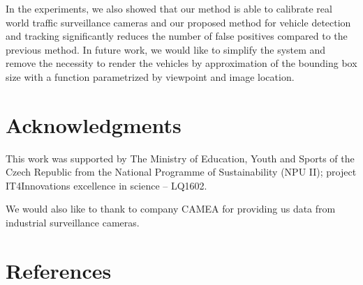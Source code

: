 \documentclass[]{elsarticle}
\begin{document}
In the experiments, we also showed that our method is able to calibrate real world traffic surveillance cameras and our proposed method for vehicle detection and tracking significantly reduces the number of false positives compared to the previous method.
In future work, we would like to simplify the system and remove the necessity to render the vehicles by approximation of the bounding box size with a function parametrized by viewpoint and image location. 




\section*{Acknowledgments}
This work was supported by The Ministry of Education, Youth and Sports of the Czech Republic from the National Programme of Sustainability (NPU II); project IT4Innovations excellence in science -- LQ1602.

We would also like to thank to company CAMEA for providing us data from industrial surveillance cameras.


\section*{References}

\end{document}

